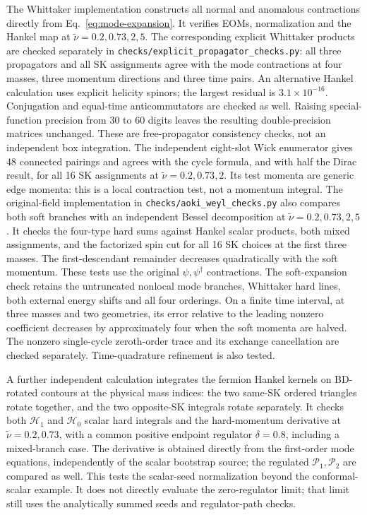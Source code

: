 \documentclass[a4paper,12pt]{article}
\newcommand{\tn}{\tilde\nu}
\begin{document}
The Whittaker implementation constructs all normal and anomalous
contractions directly from Eq.~\eqref{eq:mode-expansion}. It verifies
EOMs, normalization and the Hankel map at $\tn=0.2,0.73,2,5$.
The corresponding explicit Whittaker products are checked separately
in \texttt{checks/explicit\_}\allowbreak\texttt{propagator\_checks.py}: all three propagators
and all SK assignments agree with the mode contractions at four masses,
three momentum directions and three time pairs. An alternative Hankel
calculation uses explicit helicity spinors; the largest residual is
$3.1\times10^{-16}$. Conjugation and equal-time anticommutators are
checked as well. Raising special-function precision from 30 to 60 digits
leaves the resulting double-precision matrices unchanged. These are
free-propagator consistency checks, not an independent box integration.
The independent eight-slot Wick enumerator gives 48 connected pairings
and agrees with the cycle formula, and with half the Dirac result, for
all 16 SK assignments at $\tn=0.2,0.73,2$. Its test momenta are generic
edge momenta: this is a local contraction test, not a momentum integral.
The original-field implementation in \texttt{checks/aoki\_weyl\_checks.py}
also compares both soft branches with an independent Bessel decomposition
at $\tn=0.2,0.73,2,5$. It checks the four-type hard sums against Hankel
scalar products, both mixed assignments, and the factorized spin cut
for all 16 SK choices at the first three masses. The first-descendant
remainder decreases quadratically with the soft momentum. These tests
use the original $\psi,\psi^\dagger$ contractions.
The soft-expansion check retains the untruncated nonlocal mode branches,
Whittaker hard lines, both external energy shifts and all four
orderings. On a finite time interval, at three masses and two geometries,
its error relative to the leading nonzero coefficient decreases by
approximately four when the soft momenta are halved. The nonzero
single-cycle zeroth-order trace and its exchange cancellation are
checked separately. Time-quadrature refinement is also tested.

A further independent calculation integrates the fermion Hankel kernels
on BD-rotated contours at the physical mass indices: the two same-SK
ordered triangles rotate together, and the two opposite-SK integrals
rotate separately. It checks both $\mathcal H_1$ and $\mathcal H_0$ scalar hard
integrals and the hard-momentum derivative at $\tn=0.2,0.73$, with a common positive endpoint regulator
$\delta=0.8$, including a mixed-branch case. The derivative is obtained directly from
the first-order mode equations, independently of the scalar bootstrap
source; the regulated $\mathcal P_1,\mathcal P_2$ are compared as well. This tests the scalar-seed
normalization beyond the conformal-scalar example. It does not directly
evaluate the zero-regulator limit; that limit still uses the analytically
summed seeds and regulator-path checks.
\end{document}

